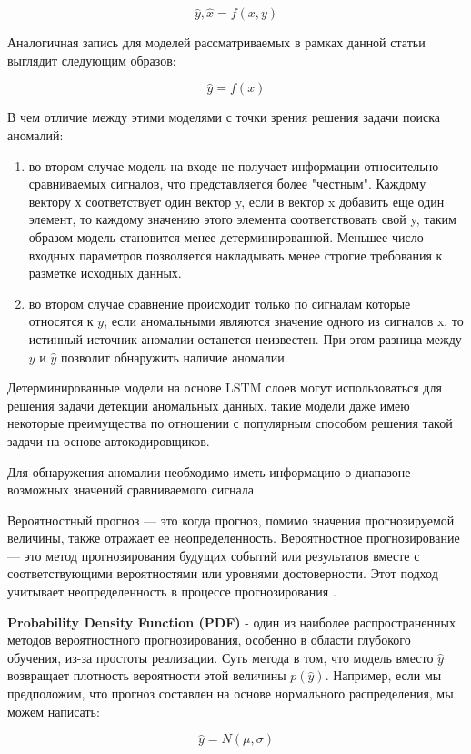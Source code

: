 \documentclass[12pt,a4paper]{article}
\begin{document}
$$\hat{y},\hat{x} = f(x,y)$$

Аналогичная запись для моделей рассматриваемых в рамках данной статьи выглядит следующим образов:

$$\hat{y} = f(x)$$

В чем отличие между этими моделями с точки зрения решения задачи поиска аномалий:
\begin{enumerate}
	\item во втором случае модель на входе не получает информации относительно сравниваемых сигналов, что представляется более "честным". Каждому вектору х соответствует один вектор y, если в вектор x добавить еще один элемент, то каждому значению этого элемента соответствовать свой y, таким образом модель становится менее детерминированной. Меньшее число входных параметров позволяется накладывать менее строгие требования к разметке исходных данных.
	\item во втором случае сравнение происходит только по сигналам которые относятся к $y$, если аномальными являются значение одного из сигналов x, то истинный источник аномалии останется неизвестен. При этом разница между $y$ и $\hat{y}$ позволит обнаружить наличие аномалии.
\end{enumerate}

Детерминированные модели на основе LSTM слоев могут использоваться для решения задачи детекции аномальных данных, такие модели даже имею некоторые преимущества по отношении с популярным способом решения такой задачи на основе автокодировщиков.


Для обнаружения аномалии необходимо иметь информацию о диапазоне возможных значений сравниваемого сигнала
 
Вероятностный прогноз — это когда прогноз, помимо значения прогнозируемой величины, также отражает ее неопределенность. Вероятностное прогнозирование — это метод прогнозирования будущих событий или результатов вместе с соответствующими вероятностями или уровнями достоверности. Этот подход учитывает неопределенность в процессе прогнозирования \cite{joseph_tackes}.

\textbf{Probability Density Function (PDF)} - один из наиболее распространенных методов вероятностного прогнозирования, особенно в области глубокого обучения, из-за простоты реализации. Суть метода в том, что модель вместо $\hat{y}$ возвращает плотность вероятности этой величины $p(\hat{y})$. Например, если мы предположим, что прогноз составлен на основе нормального распределения, мы можем написать:

$$\hat{y} = N(\mu, \sigma)$$
\end{document}
